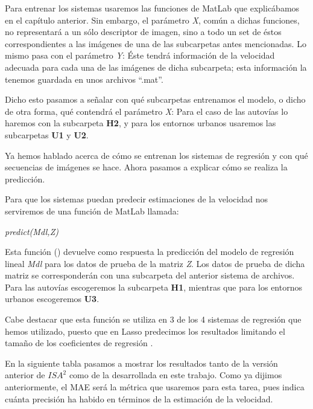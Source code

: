 Para entrenar los sistemas usaremos las funciones de MatLab que explicábamos en el capítulo anterior. Sin embargo, el parámetro \textit{X}, común a dichas funciones, no representará a un sólo descriptor de imagen, sino a todo un set de éstos correspondientes a las imágenes de una de las subcarpetas antes mencionadas. Lo mismo pasa con el parámetro \textit{Y}: Éste tendrá información de la velocidad adecuada para cada una de las imágenes de dicha subcarpeta; esta información la tenemos guardada en unos archivos ``.mat''.

Dicho esto pasamos a señalar con qué subcarpetas entrenamos el modelo, o dicho de otra forma, qué contendrá el parámetro \textit{X}: Para el caso de las autovías lo haremos con la subcarpeta \textbf{H2}, y para los entornos urbanos usaremos las subcarpetas \textbf{U1} y \textbf{U2}.

Ya hemos hablado acerca de cómo se entrenan los sistemas de regresión y con qué secuencias de imágenes se hace. Ahora pasamos a explicar cómo se realiza la predicción.

Para que los sistemas puedan predecir estimaciones de la velocidad nos serviremos de una función de MatLab llamada:

\begin{center}
\textit{predict(Mdl,Z)}
\end{center}

Esta función (\cite{predict}) devuelve como respuesta la predicción del modelo de regresión lineal \textit{Mdl} para los datos de prueba de la matriz \textit{Z}. Los datos de prueba de dicha matriz se corresponderán con una subcarpeta del anterior sistema de archivos. Para las autovías escogeremos la subcarpeta \textbf{H1}, mientras que para los entornos urbanos escogeremos \textbf{U3}.

Cabe destacar que esta función se utiliza en 3 de los 4 sistemas de regresión que hemos utilizado, puesto que en Lasso predecimos los resultados limitando el tamaño de los coeficientes de regresión \cite{coef_lasso}.

En la siguiente tabla pasamos a mostrar los resultados tanto de la versión anterior de $ISA^{2}$ \cite{isa2} como de la desarrollada en este trabajo. Como ya dijimos anteriormente, el \ac{MAE} será la métrica que usaremos para esta tarea, pues indica cuánta precisión ha habido en términos de la estimación de la velocidad.

